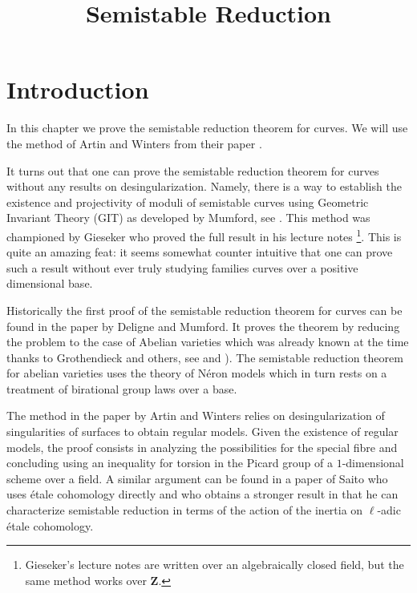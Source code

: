 

%


\title{Semistable Reduction}


\maketitle

\label{section-phantom}

\tableofcontents

\section{Introduction}
\label{section-introduction}

\noindent
In this chapter we prove the semistable reduction theorem for curves.
We will use the method of Artin and Winters from their paper
\cite{Artin-Winters}.

\medskip\noindent
It turns out that one can prove the semistable reduction theorem
for curves without any results on desingularization. Namely, there
is a way to establish the existence and projectivity of moduli
of semistable curves using Geometric Invariant Theory (GIT)
as developed by Mumford, see \cite{GIT}. This method was
championed by Gieseker who proved the full result in his
lecture notes \cite{Gieseker}\footnote{Gieseker's lecture notes
are written over an algebraically closed field, but the same method
works over $\mathbf{Z}$.}. This is quite an amazing
feat: it seems somewhat counter intuitive that one can
prove such a result without ever truly studying families curves over
a positive dimensional base.

\medskip\noindent
Historically the first proof of the semistable reduction theorem
for curves can be found in the paper \cite{DM} by Deligne and Mumford.
It proves the theorem by reducing the problem to the case of
Abelian varieties which was already known at the time thanks
to Grothendieck and others, see \cite{SGA7-I} and \cite{SGA7-II}).
The semistable reduction theorem for abelian varieties uses the theory
of N\'eron models which in turn rests on a treatment of birational
group laws over a base.

\medskip\noindent
The method in the paper by Artin and Winters relies on desingularization
of singularities of surfaces to obtain regular models. Given the existence
of regular models, the proof consists in analyzing the
possibilities for the special fibre and concluding using an inequality
for torsion in the Picard group of a $1$-dimensional scheme over a field.
A similar argument can be found in a paper \cite{Saito} of Saito who uses
\'etale cohomology directly and who obtains a stronger result in that
he can characterize semistable reduction in terms of the action of
the inertia on $\ell$-adic \'etale cohomology.

